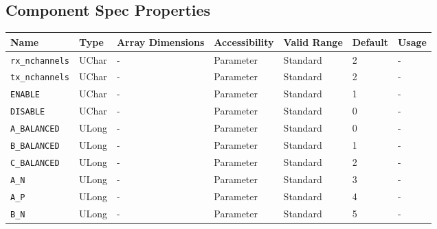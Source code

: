 \documentclass{article}
\begin{document}
\begin{landscape}
	\section*{Component Spec Properties}
	\begin{scriptsize}
		\begin{longtable}{|p{3.6cm}|p{8.1cm}|p{1.4cm}|p{1.3cm}|p{1.4cm}|p{2.5cm}|p{3.6cm}|}
			\hline
			\rowcolor{blue}
			Name               & Type & Array Dimensions & Accessibility      & Valid Range & Default & Usage                                                                               \\
			\hline
      \verb+rx_nchannels+              & UChar        & -               & Parameter             & Standard                         & 2                   & - \\
			\hline
      \verb+tx_nchannels+              & UChar        & -               & Parameter             & Standard                         & 2                   & - \\
			\hline
      \verb+ENABLE+                    & UChar        & -               & Parameter             & Standard                         & 1                   & - \\
			\hline
      \verb+DISABLE+                   & UChar        & -               & Parameter             & Standard                         & 0                   & - \\
			\hline
      \verb+A_BALANCED+                & ULong        & -               & Parameter             & Standard                         & 0                   & - \\
			\hline
      \verb+B_BALANCED+                & ULong        & -               & Parameter             & Standard                         & 1                   & - \\
			\hline
      \verb+C_BALANCED+                & ULong        & -               & Parameter             & Standard                         & 2                   & - \\
			\hline
      \verb+A_N+                       & ULong        & -               & Parameter             & Standard                         & 3                   & - \\
			\hline
      \verb+A_P+                       & ULong        & -               & Parameter             & Standard                         & 4                   & - \\
			\hline
      \verb+B_N+                       & ULong        & -               & Parameter             & Standard                         & 5                   & - \\

\end{longtable}
\end{scriptsize}
\end{landscape}
\end{document}

